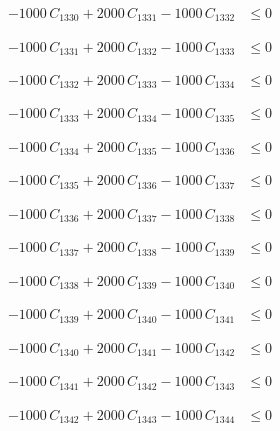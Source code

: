 \documentclass[a4paper,11pt]{article}
\begin{document}
\begin{align}
-1000\,C_{1330} + 2000\,C_{1331} - 1000\,C_{1332} &\leq 0 \nonumber
\end{align}

\begin{align}
-1000\,C_{1331} + 2000\,C_{1332} - 1000\,C_{1333} &\leq 0 \nonumber
\end{align}

\begin{align}
-1000\,C_{1332} + 2000\,C_{1333} - 1000\,C_{1334} &\leq 0 \nonumber
\end{align}

\begin{align}
-1000\,C_{1333} + 2000\,C_{1334} - 1000\,C_{1335} &\leq 0 \nonumber
\end{align}

\begin{align}
-1000\,C_{1334} + 2000\,C_{1335} - 1000\,C_{1336} &\leq 0 \nonumber
\end{align}

\begin{align}
-1000\,C_{1335} + 2000\,C_{1336} - 1000\,C_{1337} &\leq 0 \nonumber
\end{align}

\begin{align}
-1000\,C_{1336} + 2000\,C_{1337} - 1000\,C_{1338} &\leq 0 \nonumber
\end{align}

\begin{align}
-1000\,C_{1337} + 2000\,C_{1338} - 1000\,C_{1339} &\leq 0 \nonumber
\end{align}

\begin{align}
-1000\,C_{1338} + 2000\,C_{1339} - 1000\,C_{1340} &\leq 0 \nonumber
\end{align}

\begin{align}
-1000\,C_{1339} + 2000\,C_{1340} - 1000\,C_{1341} &\leq 0 \nonumber
\end{align}

\begin{align}
-1000\,C_{1340} + 2000\,C_{1341} - 1000\,C_{1342} &\leq 0 \nonumber
\end{align}

\begin{align}
-1000\,C_{1341} + 2000\,C_{1342} - 1000\,C_{1343} &\leq 0 \nonumber
\end{align}

\begin{align}
-1000\,C_{1342} + 2000\,C_{1343} - 1000\,C_{1344} &\leq 0 \nonumber
\end{align}
\end{document}
